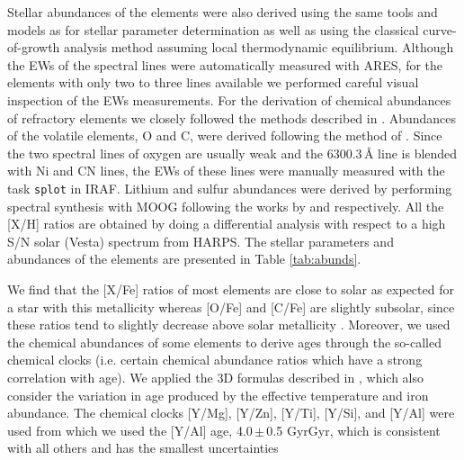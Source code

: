 \documentclass[fleqn,usenatbib]{mnras}
\newcommand{\Tstarage}{4.0\,$\pm$\,0.5 Gyr}
\begin{document}
Stellar abundances of the elements were also derived using the same tools and models as for stellar parameter determination as well as using the classical curve-of-growth analysis method assuming local thermodynamic equilibrium. Although the EWs of the spectral lines were automatically measured with ARES, for the elements with only two to three lines available we performed careful visual inspection of the EWs measurements. For the derivation of chemical abundances of refractory elements we closely followed the methods described in \citep[e.g.][]{Adibekyan-12, Adibekyan-15, Delgado-14, Delgado-17}. Abundances of the volatile elements, O and C, were derived following the method of \cite{Delgado-10, 2015A&A...576A..89B}. Since the two spectral lines of oxygen are usually weak and the 6300.3\,\AA{} line is blended with Ni and CN lines, the EWs of these lines were manually measured with the task \texttt{splot} in IRAF. Lithium and sulfur abundances were derived by performing spectral synthesis with MOOG following the works by \citet{Delgado-14} and \citet{Costa_Silva2020} respectively. All the [X/H] ratios are obtained by doing a differential analysis with respect to a high S/N solar (Vesta) spectrum from HARPS. The stellar parameters and abundances of the elements are presented in Table \ref{tab:abunds}. 

We find that the [X/Fe] ratios of most elements are close to solar as expected for a star with this metallicity whereas [O/Fe] and [C/Fe] are slightly subsolar, since these ratios tend to slightly decrease above solar metallicity \cite[e.g.][]{Bertrandelis-15,Franchini2020}. Moreover, we used the chemical abundances of some elements to derive ages through the so-called chemical clocks (i.e. certain chemical abundance ratios which have a strong correlation with age). We applied the 3D formulas described in \citet{Delgado-19}, which also consider the variation in age produced by the effective temperature and iron abundance. The chemical clocks [Y/Mg], [Y/Zn], [Y/Ti], [Y/Si], and [Y/Al] were used from which we used the [Y/Al] age, \Tstarage{}Gyr, which is consistent with all others and has the smallest uncertainties
\end{document}
